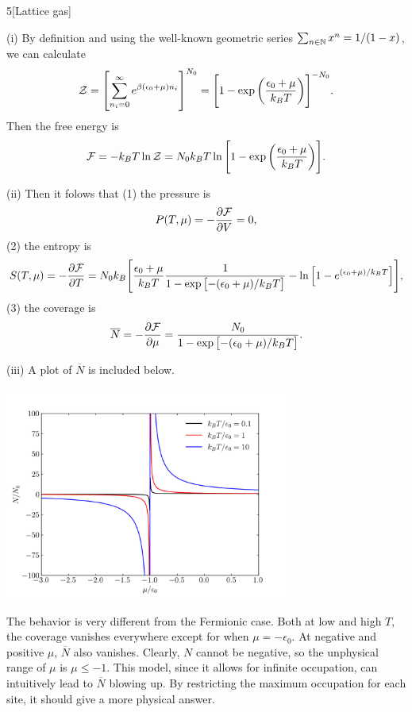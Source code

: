 \documentclass[12pt]{article}
\begin{document}
\begin{problem}{5}[Lattice gas]
\begin{solution}
(i) By definition and using the well-known geometric series
$\sum_{n\in\mathbb{N}}x^n=1/(1-x)$, we can calculate
\begin{equation}
    \mathcal{Z}=\qty[\sum_{n_i=0}^\infty e^{\beta(\epsilon_0+\mu)n_i}]^{N_0}
    =\qty[1-\exp\qty(\frac{\epsilon_0+\mu}{k_BT})]^{-N_0}.
\end{equation}
Then the free energy is
\begin{equation}
    \mathcal{F}=-k_BT\ln\mathcal{Z}
    =N_0k_BT\ln\qty[1-\exp\qty(\frac{\epsilon_0+\mu}{k_BT})].
\end{equation}

(ii) Then it folows that (1) the pressure is
\begin{equation}
    P(T,\mu)=-\frac{\partial\mathcal{F}}{\partial V}=0,
\end{equation}
(2) the entropy is
\begin{equation}
    S(T,\mu)
    =-\frac{\partial\mathcal{F}}{\partial T}
    =N_0k_B\qty[\frac{\epsilon_0+\mu}{k_BT}\frac1{1-\exp\qty[-(\epsilon_0+\mu)/k_BT]}-\ln\qty[1-e^{(\epsilon_0+\mu)/k_BT}]],
\end{equation}
(3) the coverage is
\begin{equation}
    \overline{N}
    =-\frac{\partial\mathcal{F}}{\partial\mu}
    =\frac{N_0}{1-\exp\qty[-(\epsilon_0+\mu)/k_BT]}.
\end{equation}

(iii) A plot of $\overline{N}$ is included below.
\begin{center}
    \includegraphics[width=0.7\textwidth]{p5b.png} 
\end{center}
The behavior is very different from the Fermionic case. Both at low and high
$T$, the coverage vanishes everywhere except for when $\mu=-\epsilon_0$. At
negative and positive $\mu$, $\overline{N}$ also vanishes. Clearly, $N$ cannot
be negative, so the unphysical range of $\mu$ is $\mu\leq-1$. This model, since
it allows for infinite occupation, can intuitively lead to $\overline{N}$
blowing up. By restricting the maximum occupation for each site, it should 
give a more physical answer.
\end{solution}
\end{problem}
\newpage
\end{document}
